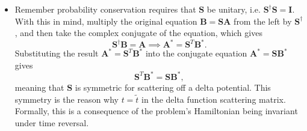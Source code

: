 \documentclass[11pt, a4paper]{article}
\renewcommand{\vec}[1]{\bm{#1}} %
\newcommand{\mat}[1]{\mathbf{#1}} %
\begin{document}
\begin{itemize}
	\item Remember probability conservation requires that $ \mat{S} $ be unitary, i.e. $ \mat{S}^{\dagger}\mat{S} = \mat{I} $. With this in mind, multiply the original equation $ \vec{B} = \mat{S} \vec{A} $ from the left by $ \mat{S}^{\dagger} $, and then take the complex conjugate of the equation, which gives
	\begin{equation*}
		\mat{S}^{\dagger}\mat{B} = \mat{A} \implies \mat{A}^{*} = \mat{S}^{T} \mat{B}^{*}.
	\end{equation*}
	Substituting the result $ \mat{A}^{*} = \mat{S}^{T} \mat{B}^{*} $ into the conjugate equation $ \vec{A}^{*} = \mat{S} \vec{B}^{*} $ gives
	\begin{equation*}
		\mat{S}^{T} \mat{B}^{*} = \mat{S} \vec{B}^{*},
	\end{equation*}
	meaning that $ \mat{S} $ is symmetric for scattering off a delta potential. This symmetry is the reason why $ t = \tilde{t} $ in the delta function scattering matrix. Formally, this is a consequence of the problem's Hamiltonian being invariant under time reversal. 


\end{itemize}
\end{document}
